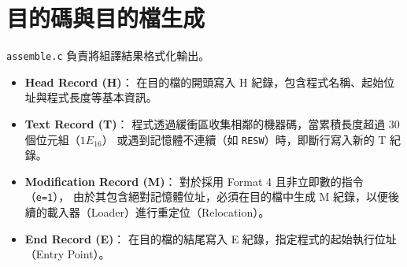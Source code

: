 \section{目的碼與目的檔生成}

\lstinline{assemble.c} 負責將組譯結果格式化輸出。
\begin{itemize}
    \item \textbf{Head Record (H)}：
          在目的檔的開頭寫入 H 紀錄，包含程式名稱、起始位址與程式長度等基本資訊。

    \item \textbf{Text Record (T)}：
          程式透過緩衝區收集相鄰的機器碼，當累積長度超過 30 個位元組（$1E_{16}$）
          或遇到記憶體不連續（如 \lstinline{RESW}）時，即斷行寫入新的 T 紀錄。

    \item \textbf{Modification Record (M)}：
          對於採用 Format 4 且非立即數的指令（\lstinline{e=1}），
          由於其包含絕對記憶體位址，必須在目的檔中生成 M 紀錄，以便後續的載入器（Loader）進行重定位（Relocation）。

    \item \textbf{End Record (E)}：
          在目的檔的結尾寫入 E 紀錄，指定程式的起始執行位址（Entry Point）。
\end{itemize}

